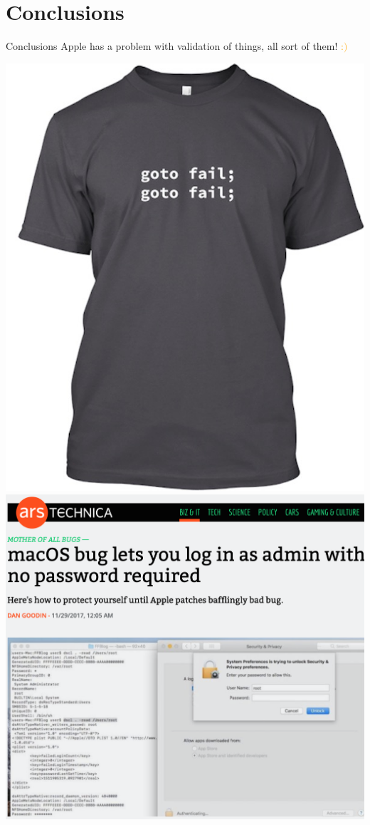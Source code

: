 \documentclass{beamer}
\begin{document}
\section{Conclusions}
\begin{frame}{Conclusions}
Apple has a problem with validation of things, all sort of them! \textcolor{orange}{:$)$}
    \begin{multicols}{2}
    \includegraphics[scale=0.2125]{gotofail}
    \includegraphics[scale=0.2125]{empty-pw}

\end{multicols}
\end{frame}
\end{document}
